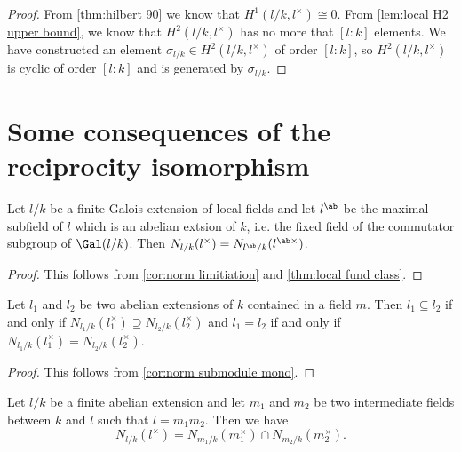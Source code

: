 \begin{proof}
	From \ref{thm:hilbert 90} we know that $H^1(l/k,l^\times) \cong 0$.
	From \ref{lem:local H2 upper bound}, we know that $H^2(l/k,l^\times)$ has no more that $[l:k]$
	elements.
	We have constructed an element $\sigma_{l/k}\in H^2(l/k,l^\times)$ of order $[l:k]$, so
	$H^2(l/k,l^\times)$ is cyclic of order $[l:k]$ and is generated by $\sigma_{l/k}$.
\end{proof}




\section{Some consequences of the reciprocity isomorphism}

\begin{theorem} \label{thm:local norm limitation}
	Let $l/k$ be a finite Galois extension of local fields and let $l^{\ab}$ be the
	maximal subfield of $l$ which is an abelian extsion of $k$, i.e. the fixed field of
	the commutator subgroup of $\Gal(l/k)$.
	Then $N_{l/k}(l^\times) = N_{l^\ab/k}(l^{\ab\times})$.
\end{theorem}

\begin{proof}
	This follows from \ref{cor:norm limitiation} and \ref{thm:local fund class}.
\end{proof}



\begin{theorem} \label{lem:local abelian classification}
	Let $l_1$ and $l_2$ be two abelian extensions of $k$ contained in a field $m$.
	Then $l_1 \subseteq l_2$ if and only if $N_{l_1/k}(l_1^\times) \supseteq N_{l_2/k}(l_2^\times)$
	and $l_1 = l_2$ if and only if $N_{l_1/k}(l_1^\times) = N_{l_2/k}(l_2^\times)$.
\end{theorem}

\begin{proof}
	This follows from \ref{cor:norm submodule mono}.
\end{proof}



\begin{lemma} \label{lem:norm composite intersection}
	Let $l/k$ be a finite abelian extension and let $m_1$ and $m_2$ be two intermediate
	fields between $k$ and $l$ such that $l = m_1 m_2$.
	Then we have
	\[
		N_{l/k}(l^\times) = N_{m_1/k} (m_1^\times) \cap N_{m_2/k} (m_2^\times).
	\]
\end{lemma}

